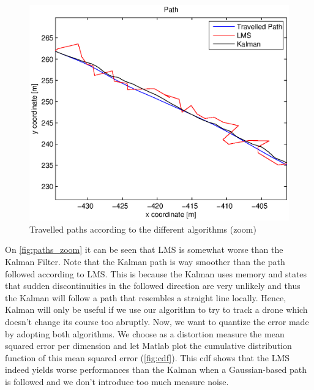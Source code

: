 \documentclass[a4paper]{article}        %
\begin{document}
			\begin{figure}[H]
				\centering
				\includegraphics[width=\textwidth]{images/tracking_algorithms_zoom.eps}
				\caption{Travelled paths according to the different algorithms (zoom)}
				\label{fig:paths_zoom}
			\end{figure}

On \autoref{fig:paths_zoom} it can be seen that LMS is somewhat worse than the Kalman Filter. Note that the Kalman path is way smoother than the path followed according to LMS. This is because the Kalman uses memory and states that sudden discontinuities in the followed direction are very unlikely and thus the Kalman will follow a path that resembles a straight line locally. Hence, Kalman will only be useful if we use our algorithm to try to track a drone which doesn't change its course too abruptly.
Now, we want to quantize the error made by adopting both algorithms. We choose as a distortion measure the mean squared error per dimension and let Matlab plot the cumulative distribution function of this mean squared error (\autoref{fig:cdf}). This cdf shows that the LMS indeed yields worse performances than the Kalman when a Gaussian-based path is followed and we don't introduce too much measure noise.
			
\end{document}
